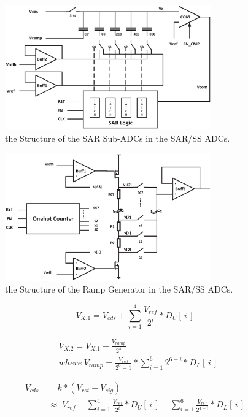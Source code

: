 \begin{figure}[htbp]
	\centerline{\includegraphics[width=3.5in]{./Figures/SAR.eps}}
	\caption{the Structure of the SAR Sub-ADCs in the SAR/SS ADCs.}
	\label{SAR}
\end{figure}

\begin{figure}[htbp] 
	\centerline{\includegraphics[width=3.5in]{./Figures/RRAMP.eps}}
	\caption{the Structure of the Ramp Generator in the SAR/SS ADCs.}
	\label{RRAMP}
\end{figure} 

\begin{equation}
	V_{X.1}=V_{cds}+\sum_{i=1}^{4} {\frac{V_{ref}}{2^{i}}\ast{D_{U}\left[\,i\,\right]}}
	\label{eq4}
\end{equation}

\begin{equation}
	\begin{aligned}
		&V_{X.2}=V_{X.1}+\frac{V_{ramp}}{2^4}\\ &where\  V_{ramp}=\frac{V_{ref}}{2^6-1}\ast\sum_{i=1}^{6}2^{6-i}\ast{D_{L}\left[\,i\,\right]}
		\label{eq5}
	\end{aligned}	
\end{equation}

\begin{equation}
	\begin{aligned}
		V_{cds}&=k\ast(V_{rst}-V_{sig})\\
		&\;{\approx}\;{V_{ref}-\sum_{i=1}^{4} \frac{V_{ref}}{2^{i}}\ast{D_{U}\left[\,i\,\right]}-\sum_{i=1}^{6} \frac{V_{ref}}{2^{4+i}}\ast{D_{L}\left[\,i\,\right]}}
		\label{eq6}
	\end{aligned}
\end{equation}

